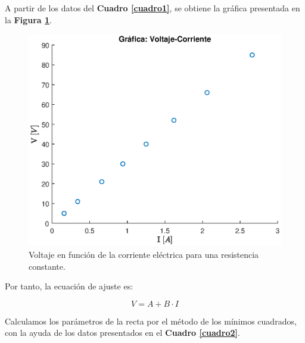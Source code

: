 \documentclass[letter,11pt]{article}
\begin{document}
A partir de los datos del \textbf{Cuadro \ref{cuadro1}}, se obtiene la gráfica
presentada en la \textbf{Figura \ref{figura5}}.

\begin{figure}[!h]
\centering
\includegraphics[scale=0.75]{resources/p1.eps}
\caption{Voltaje en función de la corriente eléctrica para una resistencia
    constante.}
\label{figura5}
\end{figure}

Por tanto, la ecuación de ajuste es:

\begin{equation*}
    V = A + B \cdot I
\end{equation*}

Calculamos los parámetros de la recta por el método de los mínimos cuadrados,
con la ayuda de los datos presentados en el \textbf{Cuadro \ref{cuadro2}}.
\end{document}
